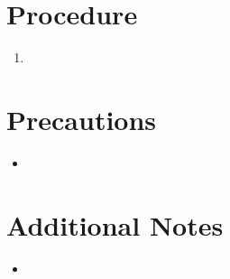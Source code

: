 \section*{Procedure}
\begin{enumerate}
    \item 
\end{enumerate}

\section*{Precautions}
\begin{itemize}[leftmargin=*]
\item 
\end{itemize}

\section*{Additional Notes}
\begin{itemize}[leftmargin=*]
\item 
 \end{itemize}
